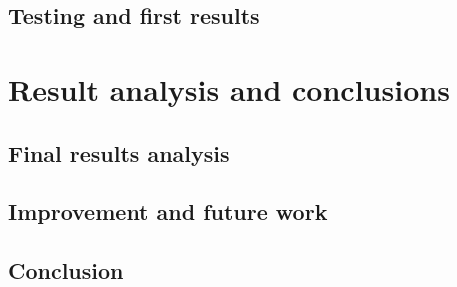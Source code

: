 \documentclass[11pt,a4paper]{article}
\begin{document}
\subsection{Testing and first results}


\section{Result analysis and conclusions}
\subsection{Final results analysis}
\subsection{Improvement and future work}
\subsection{Conclusion}




\end{document}
